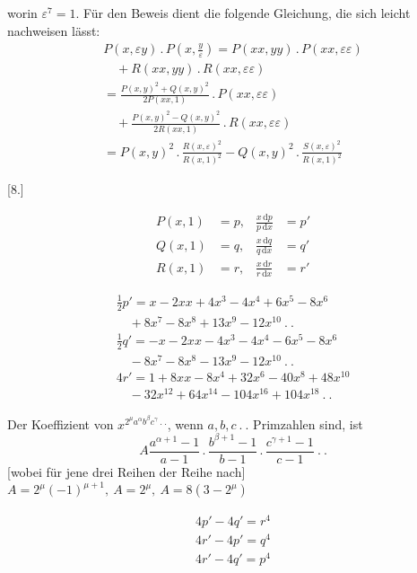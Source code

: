 worin $\varepsilon^7=1$. Für den Beweis dient die folgende Gleichung, die sich leicht nachweisen lässt:
\[
\begin{gathered}
P(x,\varepsilon y)\,.\,P(x,\tfrac{y}{\varepsilon})
=P(xx,yy)\,.\,P(xx,\varepsilon\varepsilon)\\[8pt]\quad{}+R(xx,yy)\,.\,R(xx,\varepsilon\varepsilon)\\[8pt]
=\frac{P(x,y)^2+Q(x,y)^2}{2P(xx,1)}\,.\,P(xx,\varepsilon\varepsilon)
\\[8pt]\quad{}+\frac{P(x,y)^2-Q(x,y)^2}{2R(xx,1)}\,.\,R(xx,\varepsilon\varepsilon)\\[8pt]
=P(x,y)^2\,.\,\frac{R(x,\varepsilon)^2}{R(x,1)^2}
-Q(x,y)^2\,.\,\frac{S(x,\varepsilon)^2}{R(x,1)^2}
\end{gathered}
\]

\par\medskip{}\centerline{[8.]}\nobreak\smallskip
\[
\begin{aligned}
P(x,1)&=p, & \frac{x\,\mathrm{d}p}{p\,\mathrm{d}x}&=p'\\[8pt]
Q(x,1)&=q, & \frac{x\,\mathrm{d}q}{q\,\mathrm{d}x}&=q'\\[8pt]
R(x,1)&=r, & \frac{x\,\mathrm{d}r}{r\,\mathrm{d}x}&=r'
\end{aligned}
\]

\[
\begin{gathered}
\tfrac12p'=x-2xx+4x^3-4x^4+6x^5-8x^6\\[8pt]\quad{}+8x^7-8x^8+13x^9-12x^{10}\ .\ .\\[8pt]
\tfrac12q'=-x-2xx-4x^3-4x^4-6x^5-8x^6\\[8pt]\quad{}-8x^7-8x^8-13x^9-12x^{10}\ .\ .\\[8pt]
4r'=1+8xx-8x^4+32x^6-40x^8+48x^{10}\\[8pt]\quad{}-32x^{12}+64x^{14}-104x^{16}+104x^{18}\ .\ .
\end{gathered}
\]

Der Koeffizient von $x^{2^\mu a^\alpha b^{\beta}c^\gamma\ .\ .}$, wenn $a,b,c\ .\ .$ Primzahlen sind, ist
\[
A\frac{a^{\alpha+1}-1}{a-1}\,.\,\frac{b^{\beta+1}-1}{b-1}\,.\,\frac{c^{\gamma+1}-1}{c-1}\ .\ .
\]
[wobei für jene drei Reihen der Reihe nach]
$A=2^\mu(-1)^{\mu+1},\ A=2^\mu,\ A=8(3-2^\mu)$


\[
\begin{gathered}
4p'-4q'=r^4\\[8pt]
4r'-4p'=q^4\\[8pt]
4r'-4q'=p^4
\end{gathered}
\]

